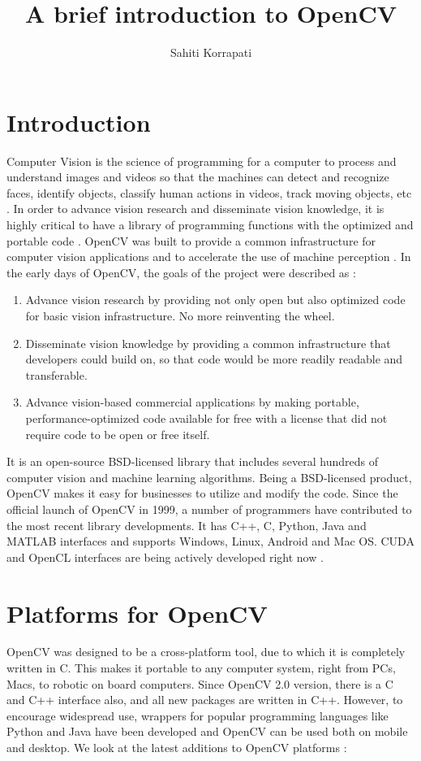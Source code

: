 \documentclass[9pt,twocolumn,twoside]{../../styles/osajnl}
\title{A brief introduction to OpenCV}
\author[1,*]{Sahiti Korrapati}
\affil[1]{School of Informatics and Computing, Bloomington, IN 47408, U.S.A.}
\affil[*]{Corresponding authors: sakorrap@iu.edu, S17-IR-2013}
\begin{document}
\maketitle
\section{Introduction}
Computer Vision is the science of programming for a computer to process and understand images and videos so that the machines can detect and recognize faces, identify objects, classify human actions in videos, track moving objects, etc \cite{www-about}. In order to advance vision research and disseminate vision knowledge, it is highly critical to have a library of programming functions with the optimized and portable code \cite{opencv-paper}. OpenCV was built to provide a common infrastructure for computer vision applications and to accelerate the use of machine perception \cite{www-about}. \newline In the early days of OpenCV, the goals of the project were described as \cite{www-opencv-wiki}:
\begin{enumerate}
    \item Advance vision research by providing not only open but also optimized code for basic vision infrastructure. No more reinventing the wheel.
    \item Disseminate vision knowledge by providing a common infrastructure that developers could build on, so that code would be more readily readable and transferable.
    \item Advance vision-based commercial applications by making portable, performance-optimized code available for free with a license that did not require code to be open or free itself.
\end{enumerate}

It is an open-source BSD-licensed library that includes several hundreds of computer vision and machine learning algorithms. Being a BSD-licensed product, OpenCV makes it easy for businesses to utilize and modify the code. Since the official launch of OpenCV in 1999, a number of programmers have contributed to the most recent library developments. It has C++, C, Python, Java and MATLAB interfaces and supports Windows, Linux, Android and Mac OS. CUDA and OpenCL interfaces are being actively developed right now \cite{www-about}.

\section{Platforms for OpenCV}
OpenCV was designed to be a cross-platform tool, due to which it is completely written in C. This makes it portable to any computer system, right from PCs, Macs, to robotic on board computers. Since OpenCV 2.0 version, there is a C and C++ interface also, and all new packages are written in C++. However, to encourage widespread use, wrappers for popular programming languages like Python and Java have been developed and OpenCV can be used both on mobile and desktop. We look at the latest additions to OpenCV platforms \cite{www-platforms}:
\end{document}

